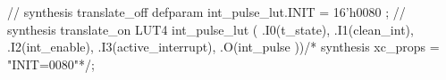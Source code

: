 \begin{vcode}
 // synthesis translate_off 
 defparam int_pulse_lut.INIT = 16'h0080 ;
 // synthesis translate_on 
 LUT4 int_pulse_lut ( 
 .I0(t_state),
 .I1(clean_int),
 .I2(int_enable),
 .I3(active_interrupt),
 .O(int_pulse ))/* synthesis xc_props = "INIT=0080"*/;
\end{vcode}

